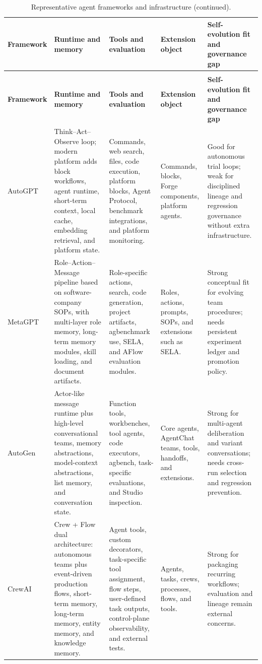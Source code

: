 {\TableTight
\begin{longtable}{@{}L{0.12\textwidth}L{0.22\textwidth}L{0.20\textwidth}L{0.16\textwidth}L{0.25\textwidth}@{}}
\caption{High-level comparison of representative agent frameworks and infrastructure for AI self-evolution.}
\label{tab:agent-framework-comparison}\\
\toprule
\textbf{Framework} & \textbf{Runtime and memory} & \textbf{Tools and evaluation} & \textbf{Extension object} & \textbf{Self-evolution fit and governance gap} \\
\midrule
\endfirsthead
\caption[]{Representative agent frameworks and infrastructure (continued).}\\
\toprule
\textbf{Framework} & \textbf{Runtime and memory} & \textbf{Tools and evaluation} & \textbf{Extension object} & \textbf{Self-evolution fit and governance gap} \\
\midrule
\endhead
\bottomrule
\endlastfoot
\cite{autogpt2023} AutoGPT & Think--Act--Observe loop; modern platform adds block workflows, agent runtime, short-term context, local cache, embedding retrieval, and platform state. & Commands, web search, files, code execution, platform blocks, Agent Protocol, benchmark integrations, and platform monitoring. & Commands, blocks, Forge components, platform agents. & Good for autonomous trial loops; weak for disciplined lineage and regression governance without extra infrastructure. \\
\cite{metagpt2023} MetaGPT & Role--Action--Message pipeline based on software-company SOPs, with multi-layer role memory, long-term memory modules, skill loading, and document artifacts. & Role-specific actions, search, code generation, project artifacts, agbenchmark use, SELA, and AFlow evaluation modules. & Roles, actions, prompts, SOPs, and extensions such as SELA. & Strong conceptual fit for evolving team procedures; needs persistent experiment ledger and promotion policy. \\
\cite{autogen2023} AutoGen & Actor-like message runtime plus high-level conversational teams, memory abstractions, model-context abstractions, list memory, and conversation state. & Function tools, workbenches, tool agents, code executors, agbench, task-specific evaluations, and Studio inspection. & Core agents, AgentChat teams, tools, handoffs, and extensions. & Strong for multi-agent deliberation and variant conversations; needs cross-run selection and regression prevention. \\
\cite{crewai2024} CrewAI & Crew + Flow dual architecture: autonomous teams plus event-driven production flows, short-term memory, long-term memory, entity memory, and knowledge memory. & Agent tools, custom decorators, task-specific tool assignment, flow steps, user-defined task outputs, control-plane observability, and external tests. & Agents, tasks, crews, processes, flows, and tools. & Strong for packaging recurring workflows; evaluation and lineage remain external concerns. \\

\end{longtable}}
